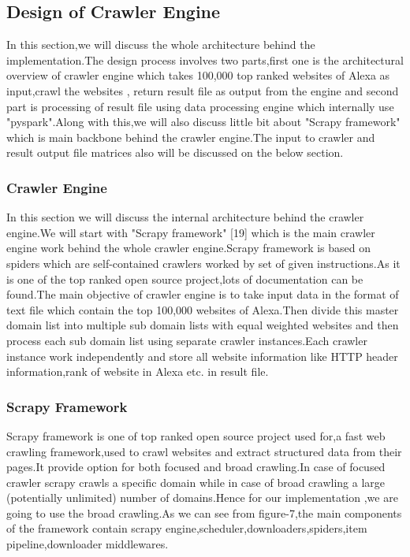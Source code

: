\subsection{Design of Crawler Engine}
In this section,we will discuss the whole architecture behind the implementation.The design process involves two parts,first one is the architectural overview of crawler engine which takes 100,000 top ranked websites of Alexa as input,crawl the websites , return result file as output from the engine and second part is processing of result file using data processing engine which internally use "pyspark".Along with this,we will also discuss little bit about "Scrapy framework" which is main backbone behind the crawler engine.The input to crawler and result output file matrices also will be discussed on the below section.

\subsubsection{Crawler Engine}
In this section we will discuss the internal architecture behind the crawler engine.We will start with "Scrapy framework" [19] which is the main crawler engine work behind the whole crawler engine.Scrapy framework is based on spiders which are self-contained crawlers worked by set of given instructions.As it is one of the top ranked open source project,lots of  documentation can be found.The main objective of crawler engine is to take input data in the format of text file which contain the top 100,000 websites of Alexa.Then divide this master domain list into multiple sub domain lists with equal weighted websites and then process each sub domain list using separate crawler instances.Each crawler instance work independently and store all website information like HTTP header information,rank of website in Alexa etc. in result file. 
\subsubsection{Scrapy Framework}
Scrapy framework is one of top ranked open source project used for,a fast web crawling framework,used to crawl websites and extract structured data from their pages.It provide option for both focused and broad crawling.In case of focused crawler scrapy crawls a specific domain while in case of broad crawling a large (potentially unlimited) number of domains.Hence for our implementation ,we are going to use the broad crawling.As we can see from figure-7,the main components of the framework contain scrapy engine,scheduler,downloaders,spiders,item pipeline,downloader middlewares.


